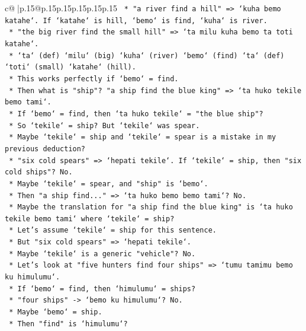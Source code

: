 \documentclass{article}
\begin{document}
{\begin{supertabular}{c@{$\;$}|p{.15\linewidth}@{}p{.15\linewidth}p{.15\linewidth}p{.15\linewidth}p{.15\linewidth}p{.15\linewidth}}
{{{\texttt{            *   "a river find a hill" => `kuha bemo katahe`. If `katahe` is hill, `bemo` is find, `kuha` is river.} \\
\texttt{            *   "the big river find the small hill" => `ta milu kuha bemo ta toti katahe`.} \\
\texttt{                *   `ta` (def) `milu` (big) `kuha` (river) `bemo` (find) `ta` (def) `toti` (small) `katahe` (hill).} \\
\texttt{                *   This works perfectly if `bemo` = find.} \\
\texttt{            *   Then what is "ship"? "a ship find the blue king" => `ta huko tekile bemo tami`.} \\
\texttt{                *   If `bemo` = find, then `ta huko tekile` = "the blue ship"?} \\
\texttt{                *   So `tekile` = ship? But `tekile` was spear.} \\
\texttt{                *   Maybe `tekile` = ship and `tekile` = spear is a mistake in my previous deduction?} \\
\texttt{                *   "six cold spears" => `hepati tekile`. If `tekile` = ship, then "six cold ships"? No.} \\
\texttt{                *   Maybe `tekile` = spear, and "ship" is `bemo`.} \\
\texttt{                *   Then "a ship find..." => `ta huko bemo bemo tami`? No.} \\
\texttt{                *   Maybe the translation for "a ship find the blue king" is `ta huko tekile bemo tami` where `tekile` = ship?} \\
\texttt{                *   Let's assume `tekile` = ship for this sentence.} \\
\texttt{                *   But "six cold spears" => `hepati tekile`.} \\
\texttt{                *   Maybe `tekile` is a generic "vehicle"? No.} \\
\texttt{                *   Let's look at "five hunters find four ships" => `tumu tamimu bemo ku himulumu`.} \\
\texttt{                    *   If `bemo` = find, then `himulumu` = ships?} \\
\texttt{                    *   "four ships" {-}> `bemo ku himulumu`? No.} \\
\texttt{                    *   Maybe `bemo` = ship.} \\
\texttt{                    *   Then "find" is `himulumu`?} \\
}}}
\end{supertabular}}
\end{document}
